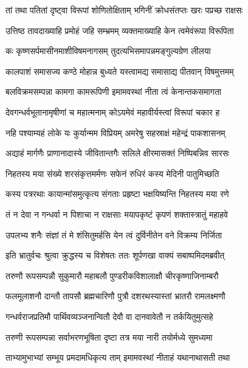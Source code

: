 
\twolineshloka
{तां तथा पतितां दृष्ट्वा विरूपां शोणितोक्षिताम्}
{भगिनीं क्रोधसंतप्तः खरः पप्रच्छ राक्षसः} %

\twolineshloka
{उत्तिष्ठ तावदाख्याहि प्रमोहं जहि सम्भ्रमम्}
{व्यक्तमाख्याहि केन त्वमेवंरूपा विरूपिता} %

\twolineshloka
{कः कृष्णसर्पमासीनमाशीविषमनागसम्}
{तुदत्यभिसमापन्नमङ्गुल्यग्रेण लीलया} %

\twolineshloka
{कालपाशं समासज्य कण्ठे मोहान्न बुध्यते}
{यस्त्वामद्य समासाद्य पीतवान् विषमुत्तमम्} %

\twolineshloka
{बलविक्रमसम्पन्ना कामगा कामरूपिणी}
{इमामवस्थां नीता त्वं केनान्तकसमागता} %

\twolineshloka
{देवगन्धर्वभूतानामृषीणां च महात्मनाम्}
{कोऽयमेवं महावीर्यस्त्वां विरूपां चकार ह} %

\twolineshloka
{नहि पश्याम्यहं लोके यः कुर्यान्मम विप्रियम्}
{अमरेषु सहस्राक्षं महेन्द्रं पाकशासनम्} %

\twolineshloka
{अद्याहं मार्गणैः प्राणानादास्ये जीवितान्तगैः}
{सलिले क्षीरमासक्तं निष्पिबन्निव सारसः} %

\twolineshloka
{निहतस्य मया संख्ये शरसंकृत्तमर्मणः}
{सफेनं रुधिरं कस्य मेदिनी पातुमिच्छति} %

\twolineshloka
{कस्य पत्ररथाः कायान्मांसमुत्कृत्य संगताः}
{प्रहृष्टा भक्षयिष्यन्ति निहतस्य मया रणे} %

\twolineshloka
{तं न देवा न गन्धर्वा न पिशाचा न राक्षसाः}
{मयापकृष्टं कृपणं शक्तास्त्रातुं महाहवे} %

\twolineshloka
{उपलभ्य शनैः संज्ञां तं मे शंसितुमर्हसि}
{येन त्वं दुर्विनीतेन वने विक्रम्य निर्जिता} %

\twolineshloka
{इति भ्रातुर्वचः श्रुत्वा क्रुद्धस्य च विशेषतः}
{ततः शूर्पणखा वाक्यं सबाष्पमिदमब्रवीत्} %

\twolineshloka
{तरुणौ रूपसम्पन्नौ सुकुमारौ महाबलौ}
{पुण्डरीकविशालाक्षौ चीरकृष्णाजिनाम्बरौ} %

\twolineshloka
{फलमूलाशनौ दान्तौ तापसौ ब्रह्मचारिणौ}
{पुत्रौ दशरथस्यास्तां भ्रातरौ रामलक्ष्मणौ} %

\twolineshloka
{गन्धर्वराजप्रतिमौ पार्थिवव्यञ्जनान्वितौ}
{देवौ वा दानवावेतौ न तर्कयितुमुत्सहे} %

\twolineshloka
{तरुणी रूपसम्पन्ना सर्वाभरणभूषिता}
{दृष्टा तत्र मया नारी तयोर्मध्ये सुमध्यमा} %

\twolineshloka
{ताभ्यामुभाभ्यां सम्भूय प्रमदामधिकृत्य ताम्}
{इमामवस्थां नीताहं यथानाथासती तथा} %

